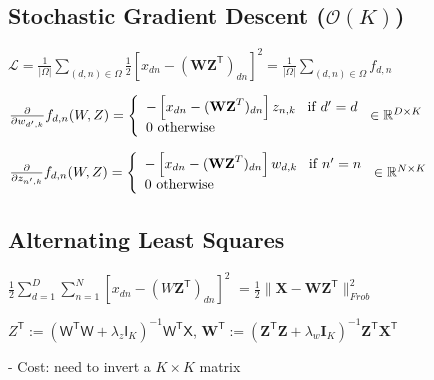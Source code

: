 \subsection*{Stochastic Gradient Descent ($\mathcal{O}(K)$)}

$\mathcal{L} = \frac{1}{|\Omega|} \sum_{(d,n)\in\Omega}{\frac{1}{2}}[x_{d n}-(\mathbf{W}\mathbf{Z}^{\textsf{T}})_{d n}]^{2}=\frac{1}{|\Omega|} \sum_{(d,n)\in\Omega} f_{d,n}$


${\frac{\partial}{\partial w_{d^{\prime},k}}}f_{d,n}(W, Z) =\left\{\begin{array}{l l}{-\left[x_{d n}-({\bf W Z}^{T})_{d n}\right]z_{n,k}\;\;\;\mathrm{if}\;d^{\prime}=d} \\ {0 \mathrm{~otherwise}}\end{array}\right.\in \mathbb{R}^{D\times K}$

${\frac{\partial}{\partial z_{n^{\prime},k}}}f_{d,n}(W, Z)=\left\{\begin{array}{l l}{-\left[x_{d n}-({\bf W Z}^{T})_{d n}\right]w_{d,k}\;\;\;\mathrm{if}\;n^{\prime}=n} \\ {0 \mathrm{~otherwise}}\end{array}\right.\in \mathbb{R}^{N\times K}$


\subsection*{Alternating Least Squares}

${\textstyle\frac{1}{2}}\sum_{d=1}^{D}\sum_{n=1}^{N}\left[x_{d n}-\left(W\mathbf{Z}^{\mathsf{T}}\right)_{d n}\right]^{2}$
$=\frac{1}{2}\|\mathbf{X}-\mathbf{W}\mathbf{Z}^{\mathsf{T}}\|_{{Frob}}^{2}$


$Z^{\mathsf{T}}:=(\mathsf{W}^{\mathsf{T}}\mathsf{W}+\lambda_{z}\mathsf{I}_{K})^{-1}\mathsf{W}^{\mathsf{T}}\mathsf{X}$,
$\mathbf{W}^{\mathsf{T}}:=(\mathbf{Z}^{\mathsf{T}}\mathbf{Z}+\lambda_{w}\mathbf{I}_{K})^{-1}\mathbf{Z}^{\mathsf{T}}\mathbf{X}^{\mathsf{T}}$

- Cost: need to invert a $K \times K$ matrix


